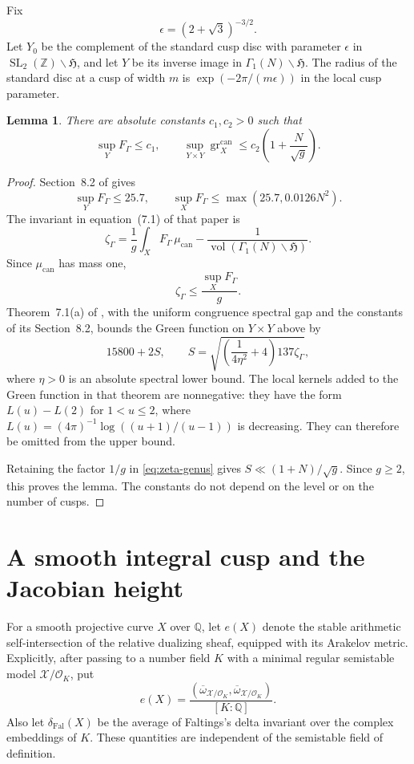 \documentclass[11pt,a4paper]{article}
\newtheorem{lemma}[theorem]{Lemma}
\theoremstyle{definition}
\newcommand{\Q}{\mathbb Q}
\newcommand{\Z}{\mathbb Z}
\newcommand{\deltaFal}{\delta_{\mathrm{Fal}}}
\newcommand{\gr}{\operatorname{gr}^{\mathrm{can}}}
\newcommand{\vol}{\operatorname{vol}}
\begin{document}
Fix
\[
 \epsilon=(2+\sqrt3)^{-3/2}.
\]
Let $Y_0$ be the complement of the standard cusp disc with
parameter $\epsilon$ in $\operatorname{SL}_2(\Z)\backslash
\mathfrak H$, and let $Y$ be its inverse image in
$\Gamma_1(N)\backslash\mathfrak H$. The radius of the standard
disc at a cusp of width $m$ is $\exp(-2\pi/(m\epsilon))$ in the
local cusp parameter.

\begin{lemma}\label{lem:green}
There are absolute constants $c_1,c_2>0$ such that
\[
 \sup_YF_\Gamma\le c_1,\qquad
 \sup_{Y\times Y}\gr_X
 \le c_2\left(1+\frac{N}{\sqrt g}\right).
\]
\end{lemma}
\begin{proof}
Section~8.2 of \cite{BruinGreen} gives
\[
 \sup_YF_\Gamma\le25.7,\qquad
 \sup_XF_\Gamma\le\max(25.7,0.0126N^2).
\]
The invariant in equation~(7.1) of that paper is
\[
 \zeta_\Gamma=
 \frac1g\int_XF_\Gamma\,\mu_{\mathrm{can}}
 -\frac1{\vol(\Gamma_1(N)\backslash\mathfrak H)}.
\]
Since $\mu_{\mathrm{can}}$ has mass one,
\begin{equation}\label{eq:zeta-genus}
 \zeta_\Gamma\le\frac{\sup_XF_\Gamma}{g}.
\end{equation}
Theorem~7.1(a) of \cite{BruinGreen}, with the uniform congruence
spectral gap and the constants of its Section~8.2, bounds the
Green function on $Y\times Y$ above by
\[
 15800+2S,\qquad
 S=\sqrt{\left(\frac1{4\eta^2}+4\right)137\zeta_\Gamma},
\]
where $\eta>0$ is an absolute spectral lower bound.
The local kernels added to the Green function in that theorem are
nonnegative: they have the form $L(u)-L(2)$ for $1<u\le2$,
where $L(u)=(4\pi)^{-1}\log((u+1)/(u-1))$ is decreasing.
They can therefore be omitted from the upper bound.

Retaining the factor $1/g$ in \eqref{eq:zeta-genus} gives
$S\ll(1+N)/\sqrt g$. Since $g\ge2$, this proves the lemma.
The constants do not depend on the level or on the number of cusps.
\end{proof}

\section{A smooth integral cusp and the Jacobian height}

For a smooth projective curve $X$ over $\Q$, let $e(X)$ denote
the stable arithmetic self-intersection of the relative dualizing
sheaf, equipped with its Arakelov metric. Explicitly, after passing
to a number field $K$ with a minimal regular semistable model
$\mathcal X/\mathcal O_K$, put
\[
 e(X)=\frac{(\overline\omega_{\mathcal X/\mathcal O_K},
                    \overline\omega_{\mathcal X/\mathcal O_K})}
                   {[K:\Q]}.
\]
Also let $\deltaFal(X)$ be the average of Faltings's delta invariant
over the complex embeddings of $K$. These quantities are independent
of the semistable field of definition.
\end{document}

